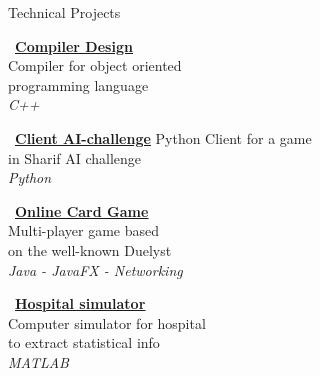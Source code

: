 \documentclass{resume} %
\begin{document}
\begin{rSection}{Technical Projects}
\begin{footnotesize}
\begin{minipage}[t]{1.6in}
\begin{center}
\vspace{0.1cm}
    \faGithub \ \href{https://github.com/MostafaOjaghi/DecafCompiler}{\bf \underline{Compiler Design}}\\
    Compiler for object oriented\\
    programming language\\
    \textcolor{Black!70}{\it C++}
\end{center}
\end{minipage}
\hspace{0.1cm}
\begin{minipage}[t]{1.6in}
\begin{center}
\vspace{0.1cm}
\faGithub \ \href{https://github.com/SharifAIChallenge/AIC20-Client-Python}{\bf \underline{Client AI-challenge}}
Python Client for a game\\
in Sharif AI challenge\\
\textcolor{Black!70}{\it Python}
\end{center}
\end{minipage}
\hspace{0.1cm}
\begin{minipage}[t]{1.6in}
\begin{center}
\vspace{0.1cm}
\faGithub \ \href{https://github.com/aps2019project/project-8/tree/master/duelyst}{\bf \underline{Online Card Game}} \\
Multi-player game based\\ 
on the well-known Duelyst\\
\textcolor{Black!70}{\it Java - JavaFX - Networking}
\end{center}
\end{minipage}
\hspace{0.1cm}
\begin{minipage}[t]{1.8in}
\begin{center}
\vspace{0.1cm}
\faGithub \ {\bf \href{https://github.com/HamidrezaKmK/HospitalSimulation}{\underline{Hospital simulator}}} \\
Computer simulator for hospital\\
to extract statistical info\\
\textcolor{Black!70}{\it MATLAB}
\end{center}
\end{minipage}
\end{footnotesize}
\end{rSection}
\end{document}
